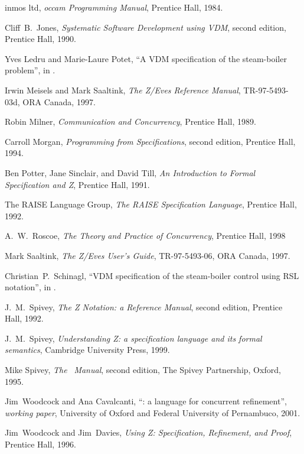 \documentclass{report}
\begin{document}
\begin{thebibliography}{XX}
 \textsf{inmos ltd}, \emph{\textsf{occam}
    Programming Manual}, Prentice Hall, 1984.

 Cliff~B.~Jones, \emph{Systematic Software
    Development using VDM}, second edition, Prentice Hall, 1990.

 Yves Ledru and Marie-Laure Potet, ``A VDM
  specification of the steam-boiler problem'', in
  \cite[pp.283--317]{abrial-borger-langmaack-96}.

 Irwin Meisels and Mark Saaltink,
  \emph{The Z/Eves Reference Manual}, TR-97-5493-03d, ORA Canada,
  1997.

 Robin Milner, \emph{Communication and
    Concurrency}, Prentice Hall, 1989.

 Carroll Morgan, \emph{Programming from
    Specifications}, second edition, Prentice Hall, 1994.

 Ben Potter, Jane Sinclair, and David
  Till, \emph{An Introduction to Formal Specification and Z}, Prentice
  Hall, 1991.

 The RAISE Language Group, \emph{The RAISE
    Specification Language}, Prentice Hall, 1992.

 A.~W.~Roscoe, \emph{The Theory and Practice of
    Concurrency}, Prentice Hall, 1998

 Mark Saaltink, \emph{The Z/Eves User's Guide},
  TR-97-5493-06, ORA Canada, 1997.

 Christian~P.~Schinagl, ``VDM specification of
  the steam-boiler control using RSL notation'', in
  \cite[pp.428--452]{abrial-borger-langmaack-96}.

 J.~M.~Spivey, \emph{The Z Notation: a Reference
    Manual}, second edition, Prentice Hall, 1992.

 J.~M.~Spivey, \emph{Understanding Z: a
    specification language and its formal semantics}, Cambridge
  University Press, 1999.

 Mike Spivey, \emph{The} \fuzz\ \emph{Manual}, second
  edition, The Spivey Partnership, Oxford, 1995.

 Jim~Woodcock and Ana Cavalcanti,
  ``\Circus: a language for concurrent refinement'', \emph{working
    paper}, University of Oxford and Federal University of Pernambuco,
  2001.

 Jim~Woodcock and Jim~Davies, \emph{Using
    Z: Specification, Refinement, and Proof}, Prentice Hall, 1996.

\end{thebibliography}
\end{document}
